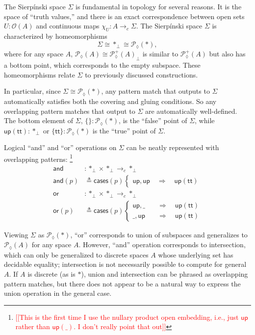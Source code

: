 \documentclass[conference]{IEEEtran}
\newcommand{\PLower}{\mathcal{P}_\lozenge}
\newcommand{\cto}{\to_c}
\newcommand{\One}{\ast}
\newcommand{\Open}[1]{\mathcal{O}({#1})}
\newcommand{\wildcard}{\_}
\newcommand{\Branch}{\Rightarrow}
\newcommand{\up}{\mathsf{up}}
\newcommand{\note}[1]{\textcolor{red}{[[{#1}]]}}
\begin{document}
The Sierp\'inski space $\Sigma$ is fundamental in topology for several reasons. It is the space of ``truth values,'' and there is an exact correspondence between open sets $U : \Open{A}$ and continuous maps $\chi_U : A \cto \Sigma$. The Sierp\'inski space $\Sigma$ is characterized by homeomorphisms
\[
\Sigma \cong \One_\bot \cong \PLower(\One) ,
\]
where for any space $A$, $\PLower(A) \cong {\PLower^+(A)}_\bot$ is similar to $\PLower^+(A)$ but also has a bottom point, which corresponds to the empty subspace. These homeomorphisms relate $\Sigma$ to previously discussed constructions.

In particular, since $\Sigma \cong \PLower(\One)$, any pattern match that outputs to $\Sigma$ automatically satisfies both the covering and gluing conditions. So any overlapping pattern matches that output to $\Sigma$ are automatically well-defined. The bottom element of $\Sigma$, $\{ \} : \PLower(\One)$, is the ``false'' point of $\Sigma$, while $\up(\mathsf{tt}) : \One_\bot$ or $\{ \mathsf{tt} \} : \PLower(\One)$ is the ``true'' point of $\Sigma$.

Logical ``and'' and ``or'' operations on $\Sigma$ can be neatly represented with overlapping patterns:
\footnote{\note{This is the first time I use the nullary product open embedding, i.e., just $\mathsf{up}$ rather than $\mathsf{up}(\wildcard)$. I don't really point that out}}
\begin{align*}
\mathsf{and} &: \One_\bot \times \One_\bot \cto \One_\bot
\\ \mathsf{and}(p) &\triangleq \mathsf{cases}(p)
\begin{cases}
\up , \up
  \quad \Branch \quad \up(\mathsf{tt})
\end{cases}
\\
\mathsf{or} &: \One_\bot \times \One_\bot \cto \One_\bot
\\ \mathsf{or}(p) &\triangleq \mathsf{cases}(p)
\begin{cases}
\up , \wildcard
  \quad &\Branch \quad \up(\mathsf{tt})
\\  \wildcard , \up
  \quad &\Branch \quad \up(\mathsf{tt})
\end{cases}
\end{align*}

Viewing $\Sigma$ as $\PLower(\One)$, ``or'' corresponds to union of subspaces and generalizes to $\PLower(A)$ for any space $A$. However, ``and'' operation corresponds to intersection, which can only be generalized to discrete spaces $A$ whose underlying set has decidable equality; intersection is not necessarily possible to compute for general $A$. If $A$ is discrete (as is $\One$), union and intersection can be phrased as overlapping pattern matches, but there does not appear to be a natural way to express the union operation in the general case.
\end{document}
